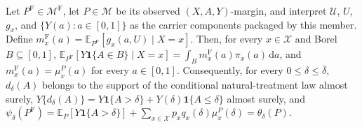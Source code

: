 Let \(P^{\mathrm F}\in\mathcal M^{\mathrm F}\), let \(P\in\mathcal M\) be its observed \((X,A,Y)\)-margin, and interpret \(\mathcal U\), \(U\), \(g_x\), and \(\{Y(a):a\in[0,1]\}\) as the carrier components packaged by this member.  Define \(m_x^{\mathrm F}(a)=\mathbb E_{P^{\mathrm F}}[g_x(a,U)\mid X=x]\).  Then, for every \(x\in\mathcal X\) and Borel \(B\subseteq[0,1]\), \(\mathbb E_{P^{\mathrm F}}[Y\mathbf 1\{A\in B\}\mid X=x]=\int_Bm_x^{\mathrm F}(a)\pi_x(a)\,\mathrm da\), and \(m_x^{\mathrm F}(a)=\mu_x^P(a)\) for every \(a\in[0,1]\).  Consequently, for every \(0\leq\delta\leq\bar\delta\), \(d_\delta(A)\) belongs to the support of the conditional natural-treatment law almost surely, \(Y\{d_\delta(A)\}=Y\mathbf 1\{A>\delta\}+Y(\delta)\mathbf 1\{A\leq\delta\}\) almost surely, and \(\psi_\delta(P^{\mathrm F})=\mathbb E_P[Y\mathbf 1\{A>\delta\}]+\sum_{x\in\mathcal X}p_xq_x(\delta)\mu_x^P(\delta)=\theta_\delta(P)\).